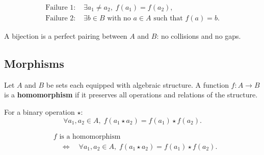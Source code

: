 \begin{remark*}
\[
\begin{aligned}
\text{Failure 1: } &\exists a_1 \ne a_2,\; f(a_1)=f(a_2), \\
\text{Failure 2: } &\exists b \in B \text{ with no } a \in A \text{ such that } f(a)=b.
\end{aligned}
\]
\end{remark*}

\begin{remark*}[Interpretation]
A bijection is a perfect pairing between $A$ and $B$: no collisions and no gaps.
\end{remark*}










\subsection*{Morphisms}



\begin{tcolorbox}[title={Definition --- Homomorphism}]
\begin{definition}[Homomorphism]
\label{def:homomorphism}
Let $A$ and $B$ be sets each equipped with algebraic structure.
A function $f : A \to B$ is a \textbf{homomorphism} if it preserves
all operations and relations of the structure.

For a binary operation $\star$:
\[
\forall a_1, a_2 \in A,\;
f(a_1 \star a_2) = f(a_1)\star f(a_2).
\]
\end{definition}
\end{tcolorbox}

\begin{remark*}
\[
\begin{aligned}
&f \text{ is a homomorphism} \\
&\quad\Longleftrightarrow\quad
\forall a_1,a_2 \in A,\;
f(a_1 \star a_2)=f(a_1)\star f(a_2).
\end{aligned}
\]
\end{remark*}

